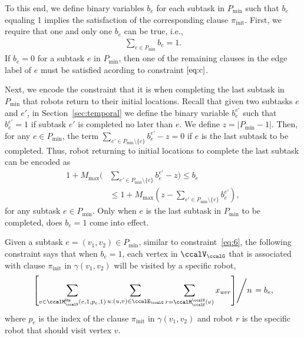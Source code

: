 \documentclass[Afour,sageh,times]{sagej}
\newcommand{\clause}[1]{\mathsf{cls}(#1)}
\begin{document}
{To this end, we define binary variables $b_e$ for each subtask in $P_{\text{min}}$ such that $b_e$ equaling 1 implies the satisfaction of the corresponding clause $\pi_{\text{init}}$. First, we require that one  and only one $b_e$ can be true, i.e.,
\begin{align}
  \sum_{e \in P_{\text{min}}} b_e = 1.
\end{align}
If $b_e=0$ for a subtask $e$ in $P_{\text{min}}$, then one of the remaining clauses in the edge label of $e$ must be satisfied acording to constraint $\eqref{eq:c}$.

Next, we encode the constraint that it is when completing the last subtask in $P_{\text{min}}$ that robots return to their initial locations. Recall that given two subtasks $e$ and $e'$, in Section~\ref{sec:temporal} we define the binary variable $b_e^{e'}$ such that $b_{e}^{e'}=1$ if subtask $e'$ is completed no later than $e$. We define $z  = |P_{\text{min}}-1|$. Then, for any $e \in P_{\text{min}}$, the term $\sum_{e' \in  P_{\text{min}}\setminus \{e \} } b_{e}^{e'} - z  = 0$ if $e$ is the last subtask to be completed. Thus, robot returning to initial locations to complete the last subtask  can be encoded as
\begin{align}
  1 + M_{\text{max}} ( &  \sum_{e' \in  P_{\text{min}}\setminus \{e \} } b_{e}^{e'} - z)  \leq  b_e \nonumber \\
  & \leq 1 + M_{\text{max}} (z - \sum_{e' \in  P_{\text{min}}\setminus \{e \} } b_{e}^{e'}),
\end{align}
for any subtask $e \in P_{\text{min}}$. Only when $e$ is the last subtask in $P_{\text{min}}$ to be completed, does $b_e = 1$ come into effect.


Given a subtask $e = (v_1, v_2) \in P_{\text{min}}$, similar to constraint~\eqref{eq:6}, the following constraint says that when $b_e=1$, each vertex in $\ccalV_\ccalG$ that is associated with clause $\pi_{\text{init}}$ in $\gamma(v_1, v_2)$  will be visited by a specific robot,
\begin{align}
  \left.   \left[ \sum_{v \in \ccalM_\ccalV^\mathsf{lits}(e, 1, p_e, 1)}   \sum_{u: (u,v) \in \ccalE_\ccalG}     \sum_{r = \ccalM_{\ccalK}^\ccalV(v) }   x_{uvr} \right] \middle/ {n} \right. = b_e,
 \end{align}
where $p_e$ is the index of the clause $\pi_{\text{init}}$ in $\gamma(v_1, v_2)$ and robot $r$ is the specific robot that should visit vertex $v$.


}
\end{document}
